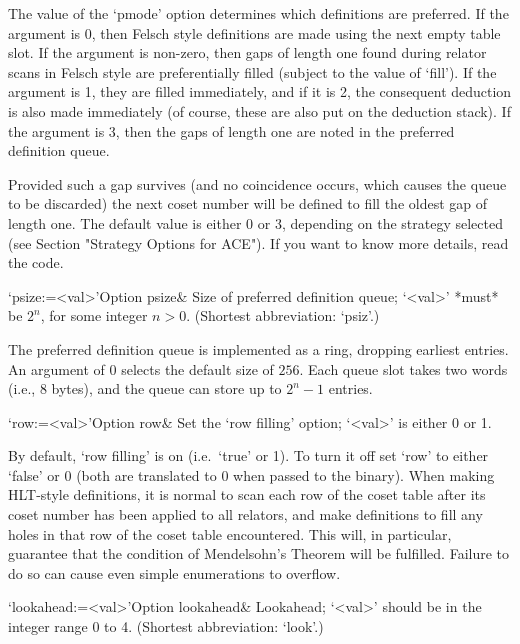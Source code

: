 The  value of  the  `pmode' option  determines  which definitions  are
preferred.  If  the argument is  0, then Felsch style  definitions are
made using  the next empty table  slot.  If the  argument is non-zero,
then gaps of length one found during relator scans in Felsch style are
preferentially  filled  (subject to  the  value  of  `fill').  If  the
argument  is 1,  they are  filled  immediately, and  if it  is 2,  the
consequent deduction  is also made  immediately (of course,  these are
also put on the deduction stack).  If the argument is 3, then the gaps
of length one are noted in the preferred definition queue.

Provided such a gap survives (and no coincidence occurs, which  causes
the queue to be discarded) the next coset number will  be  defined  to
fill the oldest gap of length one. The default value is either 0 or 3,
depending on the strategy selected (see Section "Strategy Options  for
ACE"). If you want to know more details, read the code.


\>`psize:=<val>'{Option psize}&
Size of preferred definition queue; `<val>' *must*  be $2^n$, for some
integer $n>0$. (Shortest abbreviation: `psiz'.)

The  preferred definition  queue is  implemented as  a  ring, dropping
earliest entries. An argument of 0 selects  the default size of $256$.
Each  queue slot takes two words (i.e., 8 bytes),  and the  queue  can
store up to $2^n-1$ entries.


\>`row:=<val>'{Option row}&
Set the \lq{}row filling' option; `<val>' is either 0 or 1.

By default, \lq{}row filling' is on (i.e.~`true' or 1). To turn it off
set `row' to either `false' or 0 (both are translated to 0 when passed
to  the {\ACE}  binary).   When making  HLT-style  definitions, it  is
normal to scan each row of  the coset table after its coset number has
been applied to  all relators, and make definitions  to fill any holes
in that row of the  coset table encountered. This will, in particular,
guarantee  that   the  condition  of  Mendelsohn's   Theorem  will  be
fulfilled.  Failure  to do  so can cause  even simple  enumerations to
overflow.

\>`lookahead:=<val>'{Option lookahead}&
Lookahead; `<val>' should be in the integer range 0 to 4.
(Shortest abbreviation: `look'.)
  

